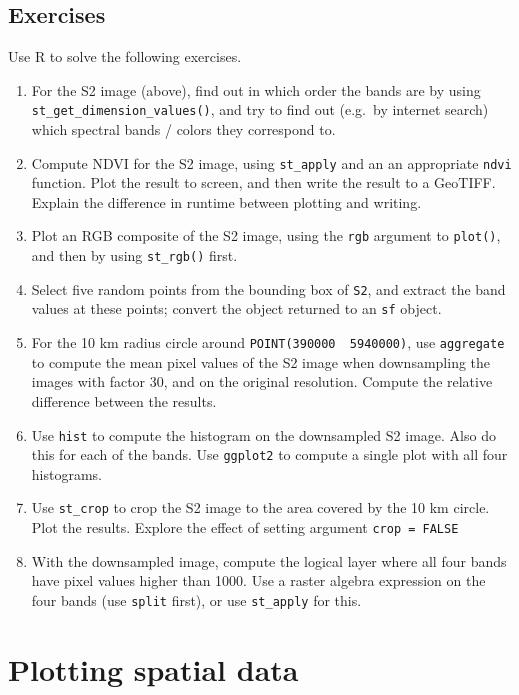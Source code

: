 \documentclass[]{book}
\providecommand{\tightlist}{%
  \setlength{\itemsep}{0pt}\setlength{\parskip}{0pt}}
\begin{document}
\hypertarget{exercises-7}{%
\section{Exercises}\label{exercises-7}}

Use R to solve the following exercises.

\begin{enumerate}
\def\labelenumi{\arabic{enumi}.}
\tightlist
\item
  For the S2 image (above), find out in which order the bands are by
  using \texttt{st\_get\_dimension\_values()}, and try to find out (e.g.~by internet
  search) which spectral bands / colors they correspond to.
\item
  Compute NDVI for the S2 image, using \texttt{st\_apply} and an an appropriate
  \texttt{ndvi} function. Plot the result to screen, and then write the
  result to a GeoTIFF. Explain the difference in runtime between
  plotting and writing.
\item
  Plot an RGB composite of the S2 image, using the \texttt{rgb} argument
  to \texttt{plot()}, and then by using \texttt{st\_rgb()} first.
\item
  Select five random points from the bounding box of \texttt{S2}, and extract
  the band values at these points; convert the object returned to an \texttt{sf}
  object.
\item
  For the 10 km radius circle around \texttt{POINT(390000\ \ 5940000)}, use
  \texttt{aggregate} to compute the mean pixel values of the S2 image
  when downsampling the images with factor 30, and on the original
  resolution. Compute the relative difference between the results.
\item
  Use \texttt{hist} to compute the histogram on the downsampled S2 image.
  Also do this for each of the bands. Use \texttt{ggplot2} to compute a
  single plot with all four histograms.
\item
  Use \texttt{st\_crop} to crop the S2 image to the area covered by the 10 km circle.
  Plot the results. Explore the effect of setting argument \texttt{crop\ =\ FALSE}
\item
  With the downsampled image, compute the logical layer where all four
  bands have pixel values higher than 1000. Use a raster algebra expression
  on the four bands (use \texttt{split} first), or use \texttt{st\_apply} for this.
\end{enumerate}

\hypertarget{plotting}{%
\chapter{Plotting spatial data}\label{plotting}}
\end{document}
